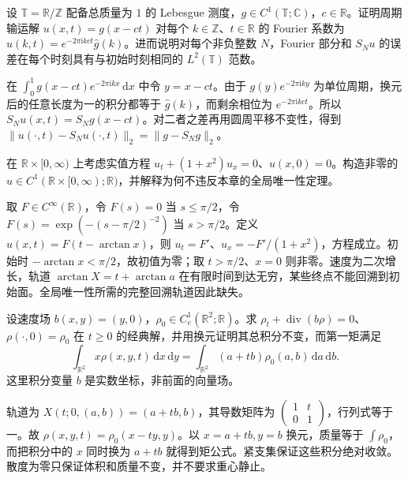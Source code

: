 \begin{exercise}\label{b2:ex:07-fourier-translation}
设 \(\mathbb T=\mathbb R/\mathbb Z\) 配备总质量为 \(1\) 的 Lebesgue 测度，\(g\in C^1(\mathbb T;\mathbb C)\)，\(c\in\mathbb R\)。证明周期输运解 \(u(x,t)=g(x-ct)\) 对每个 \(k\in\mathbb Z\)、\(t\in\mathbb R\) 的 Fourier 系数为
\(\widehat u(k,t)=e^{-2\pi\mathrm i kct}\widehat g(k)\)。进而说明对每个非负整数 \(N\)，Fourier 部分和 \(S_Nu\) 的误差在每个时刻具有与初始时刻相同的 \(L^2(\mathbb T)\) 范数。
\end{exercise}
\begin{solution}
在 \(\int_0^1g(x-ct)e^{-2\pi\mathrm i kx}\,\mathrm dx\) 中令 \(y=x-ct\)。由于 \(g(y)e^{-2\pi\mathrm i ky}\) 为单位周期，换元后的任意长度为一的积分都等于 \(\widehat g(k)\)，而剩余相位为 \(e^{-2\pi\mathrm i kct}\)。所以 \(S_Nu(x,t)=S_Ng(x-ct)\)。对二者之差再用圆周平移不变性，得到 \(\|u(\cdot,t)-S_Nu(\cdot,t)\|_2=\|g-S_Ng\|_2\)。
\end{solution}

\begin{exercise}\label{b2:ex:07-infinity-inflow}
在 \(\mathbb R\times[0,\infty)\) 上考虑实值方程 \(u_t+(1+x^2)u_x=0\)、\(u(x,0)=0\)。构造非零的 \(u\in C^1(\mathbb R\times[0,\infty);\mathbb R)\)，并解释为何不违反本章的全局唯一性定理。
\end{exercise}
\begin{solution}
取 \(F\in C^\infty(\mathbb R)\)，令 \(F(s)=0\) 当 \(s\leq\pi/2\)，令 \(F(s)=\exp(-(s-\pi/2)^{-2})\) 当 \(s>\pi/2\)。定义 \(u(x,t)=F(t-\arctan x)\)，则 \(u_t=F'\)、\(u_x=-F'/(1+x^2)\)，方程成立。初始时 \(-\arctan x<\pi/2\)，故初值为零；取 \(t>\pi/2\)、\(x=0\) 则非零。速度为二次增长，轨道 \(\arctan X=t+\arctan a\) 在有限时间到达无穷，某些终点不能回溯到初始面。全局唯一性所需的完整回溯轨道因此缺失。
\end{solution}

\begin{exercise}\label{b2:ex:07-shear-moment}
设速度场 \(b(x,y)=(y,0)\)，\(\rho_0\in C_c^1(\mathbb R^2;\mathbb R)\)。求 \(\rho_t+\operatorname{div}(b\rho)=0\)、\(\rho(\cdot,0)=\rho_0\) 在 \(t\geq0\) 的经典解，并用换元证明其总积分不变，而第一矩满足
\[
 \int_{\mathbb R^2}x\rho(x,y,t)\,\mathrm dx\,\mathrm dy
 =\int_{\mathbb R^2}(a+tb)\rho_0(a,b)\,\mathrm da\,\mathrm db.
\]
这里积分变量 \(b\) 是实数坐标，非前面的向量场。
\end{exercise}
\begin{solution}
轨道为 \(X(t;0,(a,b))=(a+tb,b)\)，其导数矩阵为 \(\left(\begin{smallmatrix}1&t\\0&1\end{smallmatrix}\right)\)，行列式等于一。故 \(\rho(x,y,t)=\rho_0(x-ty,y)\)。以 \(x=a+tb,y=b\) 换元，质量等于 \(\int\rho_0\)，而把积分中的 \(x\) 同时换为 \(a+tb\) 就得到矩公式。紧支集保证这些积分绝对收敛。散度为零只保证体积和质量不变，并不要求重心静止。
\end{solution}

